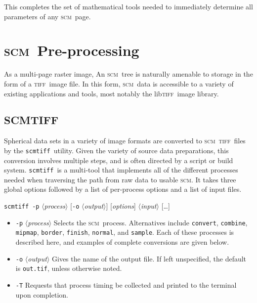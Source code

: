 \documentclass[oneside,10pt]{memoir}
\newcommand{\scm}     {\textsc{scm}}
\newcommand{\tiff}    {\textsc{tiff}}
\newcommand{\libtiff} {lib\textsc{tiff}}
\newcommand{\scmtiff} {\texttt{scmtiff}}
\newcommand{\inangles}[1]{$\langle$#1$\rangle$}
\newenvironment{optionlist}
  {\setlength{\leftmargini}{1in}\begin{itemize}}{\end{itemize}}
\begin{document}
\begin{Spacing}{1.1}
This completes the set of mathematical tools needed to immediately determine all parameters of any \scm\ page.


\chapter{\scm\ Pre-processing}

As a multi-page raster image, An \scm\ tree is naturally amenable to storage in the form of a \tiff\ image file. In this form, \scm\ data is accessible to a variety of existing applications and tools, most notably the \libtiff\ image library.

\section{SCMTIFF}

Spherical data sets in a variety of image formats are converted to \scm\ \tiff\ files by the \scmtiff\ utility. Given the variety of source data preparations, this conversion involves multiple steps, and is often directed by a script or build system. \scmtiff\ is a multi-tool that implements all of the different processes needed when traversing the path from raw data to usable \scm. It takes three global options followed by a list of per-process options and a list of input files.

\bigskip\noindent\scmtiff\ \texttt{-p} \inangles{\textit{process}} [\texttt{-o} \inangles{\textit{output}}] [\textit{options}] \inangles{\textit{input}} [\ldots]

\begin{optionlist}
\item[\texttt{-p} \inangles{\textit{process}}] Selects the \scm\ process. Alternatives include \texttt{convert}, \texttt{combine}, \texttt{mipmap}, \texttt{border}, \texttt{finish}, \texttt{normal}, and \texttt{sample}. Each of these processes is described here, and examples of complete conversions are given below.

\item[\texttt{-o} \inangles{\textit{output}}] Gives the name of the output file. If left unspecified, the default is \texttt{out.tif}, unless otherwise noted.

\item[\texttt{-T}] Requests that process timing be collected and printed to the terminal upon completion.
\end{optionlist}


\end{Spacing}
\end{document}
